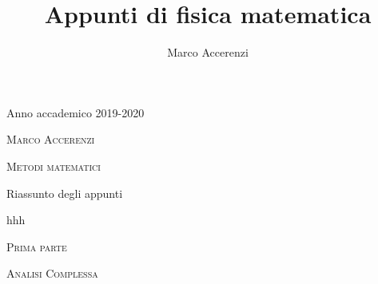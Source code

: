 \documentclass[11pt,a4paper,twoside]{book}
\author{Marco Accerenzi}
\date{}
\title{Appunti di fisica matematica}
\theoremstyle{esss}
\theoremstyle{dotless}
\numberwithin{equation}{section} %
\begin{document}
\frontmatter


\begin{titlepage}
	\begin{center}

	\begin{center}
		\centering
		Anno accademico 2019-2020\par
		\vspace{.05\textheight}
	\end{center}	

		\vspace{.1\textheight}
		{\LARGE\scshape \textsc{Marco Accerenzi}\par}
		\vspace{.1\textheight}
		\textsc{}\par
		\vspace{.05\textheight}
		{\Huge \textsc{Metodi matematici}\par}
		\vspace{.05\textheight}
		{\large Riassunto degli appunti\par}
		\vfill
		{\centering\large
hhh
  }
  \vspace{2cm} 
\end{center}
\end{titlepage}
\thispagestyle{plain}

\setcounter{page}{1}
\tableofcontents\clearpage\thispagestyle{plain}

\pagestyle{fancy}

\cleardoublepage
\mainmatter\setcounter{page}{1}
\thispagestyle{plain}
	\begin{center}
		\vspace{.1\textheight}
		{\LARGE\scshape \textsc{Prima parte}\par}
		\vspace{.1\textheight}
		\textsc{}\par
		\vspace{.05\textheight}
		{\Huge \textsc{Analisi Complessa}\par}
		\vfill

\end{center}
\end{document}
